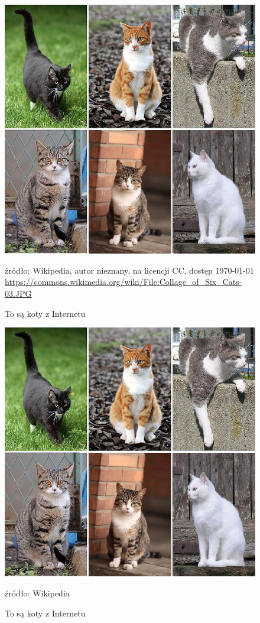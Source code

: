 \begin{figure}
    \centering
    \includegraphics[width=.5\textwidth]{chapters/mistakes/img/kot1.jpg}
    \caption{To są koty z Internetu}%
    \label{fig:koty1}
    \footnotesize{źródło: Wikipedia, autor nieznany, na licencji CC, dostęp \today \\ \url{https://commons.wikimedia.org/wiki/File:Collage_of_Six_Cats-03.JPG}}
\end{figure}

\begin{figure}
    \centering
    \includegraphics[width=.5\textwidth]{chapters/mistakes/img/kot1.jpg}
    \caption{To są koty z Internetu}%
    \label{fig:koty2}
    \footnotesize{źródło: Wikipedia \cite{kot1}}
\end{figure}
